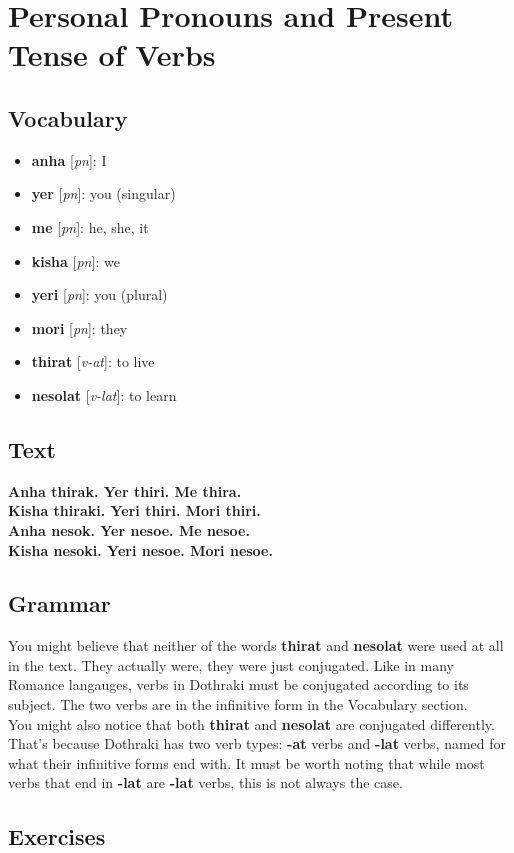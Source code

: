\chapter{Personal Pronouns and Present Tense of Verbs}
\section*{Vocabulary}
\begin{itemize}
	\item \textbf{anha} [\textit{pn}]: I
	\item \textbf{yer} [\textit{pn}]: you (singular)
	\item \textbf{me} [\textit{pn}]: he, she, it
	\item \textbf{kisha} [\textit{pn}]: we
	\item \textbf{yeri} [\textit{pn}]: you (plural)
	\item \textbf{mori} [\textit{pn}]: they
	\item \textbf{thirat} [\textit{v-at}]: to live
	\item \textbf{nesolat} [\textit{v-lat}]: to learn
\end{itemize}
\section*{Text}
	\textbf{Anha thirak. Yer thiri. Me thira.} \\
  \textbf{Kisha thiraki. Yeri thiri. Mori thiri.} \\
	\textbf{Anha nesok. Yer nesoe. Me nesoe.} \\
	\textbf{Kisha nesoki. Yeri nesoe. Mori nesoe.}
\section*{Grammar}
You might believe that neither of the words \textbf{thirat} and \textbf{nesolat}
were used at all in the text. They actually were, they were just conjugated.
Like in many Romance langauges, verbs in Dothraki must be conjugated according
to its subject. The two verbs are in the infinitive form in the Vocabulary section.\\
You might also notice that both \textbf{thirat} and \textbf{nesolat} are
conjugated differently. That's because Dothraki has two verb types: \textbf{-at}
verbs and \textbf{-lat} verbs, named for what their infinitive forms end with.
It must be worth noting that while most verbs that end in \textbf{-lat} are \textbf{-lat} verbs,
this is not always the case.
\section*{Exercises}
